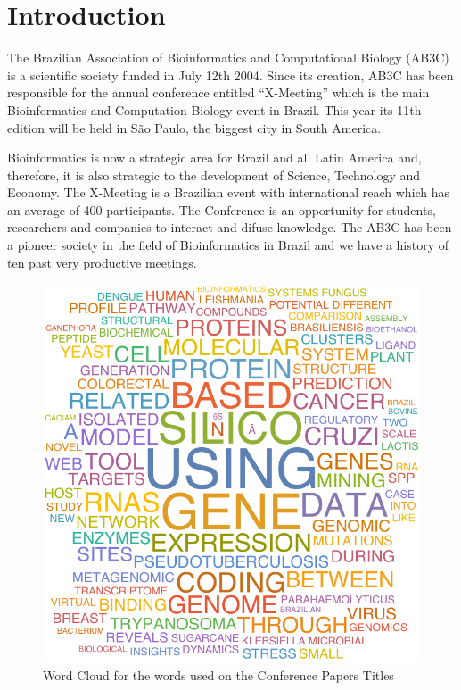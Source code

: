 \chapter{Introduction}
The Brazilian Association of Bioinformatics and Computational Biology (AB3C) is a scientific society funded in July 12th 2004. Since its creation, AB3C has been responsible for the annual conference entitled “X-Meeting” which is the main Bioinformatics and Computation Biology event in Brazil. This year its 11th edition will be held in São Paulo, the biggest city in South America.

	
Bioinformatics is now a strategic area for Brazil and all Latin America and,
therefore, it is also strategic to the development of Science, Technology and
Economy. The X-Meeting is a Brazilian event with international reach which has
an average of 400 participants. The Conference is an opportunity for students,
researchers and companies to interact and difuse knowledge. The AB3C has been a
pioneer society in the field of Bioinformatics in Brazil and we have a history
of ten past very productive meetings.
\begin{center}
  \begin{figure}
  \includegraphics[scale=0.9]{wordcloud}

\caption{Word Cloud for the words used on the Conference Papers Titles}
\end{figure}
\end{center}